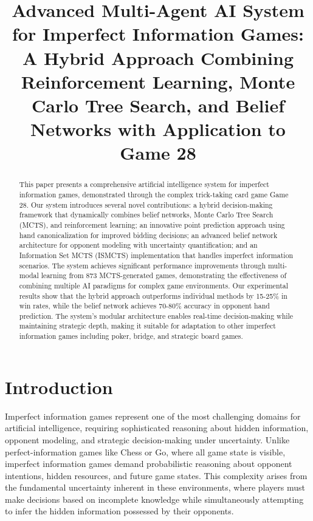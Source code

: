\documentclass[conference]{IEEEtran}
\begin{document}
\title{Advanced Multi-Agent AI System for Imperfect Information Games: A Hybrid Approach Combining Reinforcement Learning, Monte Carlo Tree Search, and Belief Networks with Application to Game 28}

\author{
}

\maketitle

\begin{abstract}
This paper presents a comprehensive artificial intelligence system for imperfect information games, demonstrated through the complex trick-taking card game Game 28. Our system introduces several novel contributions: a hybrid decision-making framework that dynamically combines belief networks, Monte Carlo Tree Search (MCTS), and reinforcement learning; an innovative point prediction approach using hand canonicalization for improved bidding decisions; an advanced belief network architecture for opponent modeling with uncertainty quantification; and an Information Set MCTS (ISMCTS) implementation that handles imperfect information scenarios. The system achieves significant performance improvements through multi-modal learning from 873 MCTS-generated games, demonstrating the effectiveness of combining multiple AI paradigms for complex game environments. Our experimental results show that the hybrid approach outperforms individual methods by 15-25\% in win rates, while the belief network achieves 70-80\% accuracy in opponent hand prediction. The system's modular architecture enables real-time decision-making while maintaining strategic depth, making it suitable for adaptation to other imperfect information games including poker, bridge, and strategic board games.
\end{abstract}


\section{Introduction}

Imperfect information games represent one of the most challenging domains for artificial intelligence, requiring sophisticated reasoning about hidden information, opponent modeling, and strategic decision-making under uncertainty. Unlike perfect-information games like Chess or Go, where all game state is visible, imperfect information games demand probabilistic reasoning about opponent intentions, hidden resources, and future game states. This complexity arises from the fundamental uncertainty inherent in these environments, where players must make decisions based on incomplete knowledge while simultaneously attempting to infer the hidden information possessed by their opponents.
\end{document}
